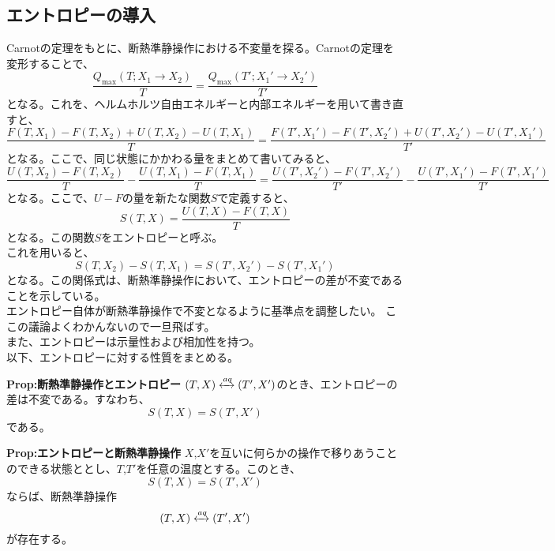 \documentclass[a4paper,11pt]{jsarticle}
\begin{document}
\subsection{エントロピーの導入}
Carnotの定理をもとに、断熱準静操作における不変量を探る。Carnotの定理を変形することで、
\begin{equation}
    \frac{Q_{\text{max}}(T;X_1\rightarrow X_2)}{T} = \frac{Q_{\text{max}}(T';X_1'\rightarrow X_2')}{T'}
\end{equation}
となる。これを、ヘルムホルツ自由エネルギーと内部エネルギーを用いて書き直すと、
\begin{equation}
    \frac{F(T,X_1)-F(T,X_2)+U(T,X_2)-U(T,X_1)}{T} = \frac{F(T',X_1')-F(T',X_2')+U(T',X_2')-U(T',X_1')}{T'}
\end{equation}
となる。ここで、同じ状態にかかわる量をまとめて書いてみると、
\begin{equation}
    \frac{U(T,X_2)-F(T,X_2)}{T} - \frac{U(T,X_1)-F(T,X_1)}{T} = \frac{U(T',X_2')-F(T',X_2')}{T'} - \frac{U(T',X_1')-F(T',X_1')}{T'}
\end{equation}
となる。ここで、$U-F$の量を新たな関数$S$で定義すると、
\begin{equation}
    S(T,X) = \frac{U(T,X)-F(T,X)}{T}
\end{equation}
となる。この関数$S$をエントロピーと呼ぶ。\\
これを用いると、
\begin{equation}
    S(T,X_2)-S(T,X_1) = S(T',X_2')-S(T',X_1')
\end{equation}
となる。この関係式は、断熱準静操作において、エントロピーの差が不変であることを示している。\\
エントロピー自体が断熱準静操作で不変となるように基準点を調整したい。
ここの議論よくわかんないので一旦飛ばす。\\

また、エントロピーは示量性および相加性を持つ。\\
以下、エントロピーに対する性質をまとめる。\\
\begin{itembox}[l]{\textbf{Prop:断熱準静操作とエントロピー}}
    $(T,X) \xleftrightarrow{aq} (T',X')$のとき、エントロピーの差は不変である。すなわち、
    \begin{equation}
        S(T,X) = S(T',X')
    \end{equation}
    である。
\end{itembox}

\begin{itembox}[l]{\textbf{Prop:エントロピーと断熱準静操作}}
    $X$,$X'$を互いに何らかの操作で移りあうことのできる状態ととし、$T$,$T'$を任意の温度とする。このとき、
    \begin{equation}
        S(T,X) = S(T',X')
    \end{equation}
    ならば、断熱準静操作
    \begin{equation}
        (T,X) \xleftrightarrow{aq} (T',X')
    \end{equation}
    が存在する。
\end{itembox}
\end{document}
